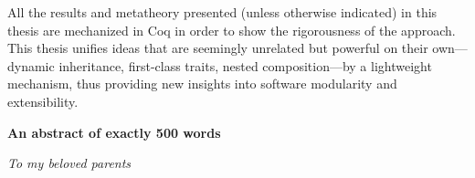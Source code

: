 All the results and metatheory presented (unless otherwise indicated) in this
thesis are mechanized in Coq in order to show the rigorousness of the approach.
This thesis unifies ideas that are seemingly unrelated but powerful on their
own---dynamic inheritance, first-class traits, nested composition---by a
lightweight mechanism, thus providing new insights into software modularity and
extensibility.

\vspace{1.5\baselineskip}

\noindent\makebox[\linewidth]{\rule{0.7\textwidth}{0.4pt}}

\begin{center}
\textbf{An abstract of exactly 500 words}
\end{center}

\newpage

\begin{flushright}
  \null{}
  \textit{To my beloved parents}
  \null
\end{flushright}
